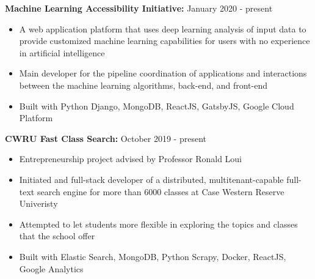 \documentclass[a4paper,11pt]{article}
\begin{document}
\begin{flushleft}
	
	\textbf{Machine Learning Accessibility Initiative:} January 2020 - present
	\vspace{-\topsep}
	\begin{itemize}
		\setlength{\itemsep}{0pt plus 1pt}
		\item A web application platform that uses deep learning analysis of input data to provide customized machine learning capabilities for users with no experience in artificial intelligence
		\item Main developer for the pipeline coordination of applications and interactions between the machine learning algorithms, back-end, and front-end
		\item Built with Python Django, MongoDB, ReactJS, GatsbyJS, Google Cloud Platform
	\end{itemize}
	
	
	\textbf{CWRU Fast Class Search:} October 2019 - present
	\vspace{-\topsep}
	\begin{itemize}
		\setlength{\itemsep}{0pt plus 1pt}
		\item Entrepreneurship project advised by Professor Ronald Loui
		\item Initiated and full-stack developer of a distributed, multitenant-capable full-text search engine for more than 6000 classes at Case Western Reserve Univeristy
		\item Attempted to let students more flexible in exploring the topics and classes that the school offer
		\item Built with Elastic Search, MongoDB, Python Scrapy, Docker, ReactJS, Google Analytics
	\end{itemize}
	
	
\centering{\noindent\makebox{\rule{8cm}{1.5pt}}}
\end{flushleft}
\end{document}
